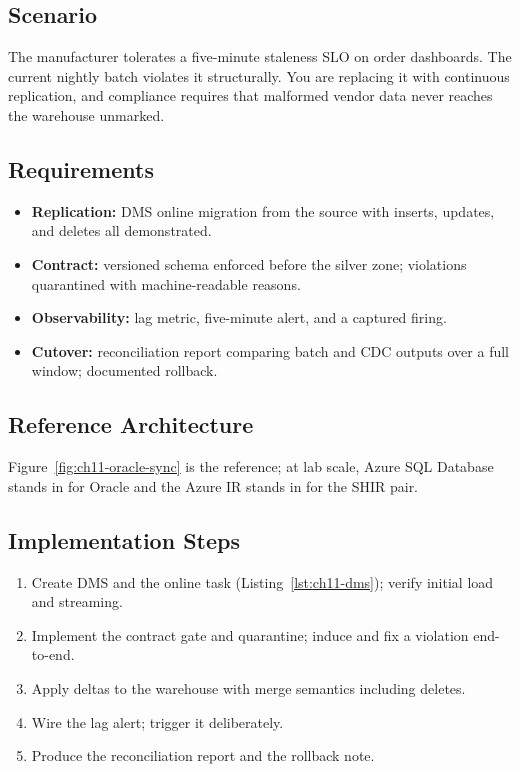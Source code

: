 \subsection*{Scenario}
The manufacturer tolerates a five-minute staleness SLO on order dashboards. The current nightly batch violates it structurally. You are replacing it with continuous replication, and compliance requires that malformed vendor data never reaches the warehouse unmarked.

\subsection*{Requirements}
\begin{itemize}
    \item \textbf{Replication:} DMS online migration from the source with inserts, updates, and deletes all demonstrated.
    \item \textbf{Contract:} versioned schema enforced before the silver zone; violations quarantined with machine-readable reasons.
    \item \textbf{Observability:} lag metric, five-minute alert, and a captured firing.
    \item \textbf{Cutover:} reconciliation report comparing batch and CDC outputs over a full window; documented rollback.
\end{itemize}

\subsection*{Reference Architecture}
Figure~\ref{fig:ch11-oracle-sync} is the reference; at lab scale, Azure SQL Database stands in for Oracle and the Azure IR stands in for the SHIR pair.

\subsection*{Implementation Steps}
\begin{enumerate}
    \item Create DMS and the online task (Listing~\ref{lst:ch11-dms}); verify initial load and streaming.
    \item Implement the contract gate and quarantine; induce and fix a violation end-to-end.
    \item Apply deltas to the warehouse with merge semantics including deletes.
    \item Wire the lag alert; trigger it deliberately.
    \item Produce the reconciliation report and the rollback note.
\end{enumerate}

